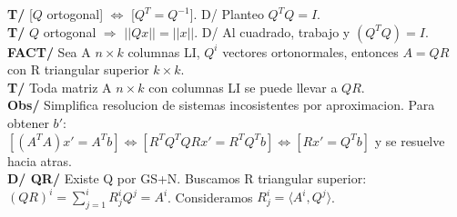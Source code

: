 \documentclass[10pt,a4paper]{article}
\begin{document}
\textbf{T/} [$Q$ ortogonal] $\iff$ [$Q^T = Q^{-1}$]. D/ Planteo $Q^TQ=I$.\\
\textbf{T/} $Q$ ortogonal $\Rightarrow$ $||Qx|| = ||x||$. D/ Al cuadrado, trabajo y $(Q^TQ)=I$.\\
\textbf{FACT/} Sea A $n \times k$ columnas LI, $Q^i$ vectores ortonormales, entonces $A = QR$ con R triangular superior $k \times k$.\\
\textbf{T/} Toda matriz A $n \times k$ con columnas LI se puede llevar a $QR$.\\
\textbf{Obs/} Simplifica resolucion de sistemas incosistentes por aproximacion. Para obtener $b'$:\\
$[(A^TA)x' = A^Tb] \iff [R^TQ^TQRx'=R^TQ^Tb] \iff [Rx'=Q^Tb]$ y se resuelve hacia atras.\\
\textbf{D/ QR/} Existe Q por GS+N. Buscamos R triangular superior: $(QR)^i = \sum_{j=1}^iR^i_jQ^j = A^i$. Consideramos $R^i_j = \langle A^i,Q^j\rangle$.
\end{document}

